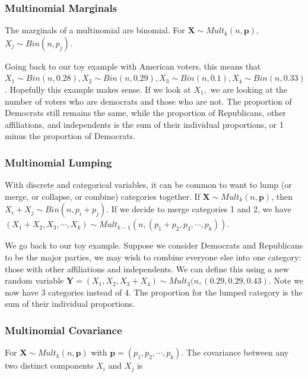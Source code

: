 \documentclass[
]{book}
\begin{document}
\subsubsection{Multinomial Marginals}\label{multinomial-marginals}

The marginals of a multinomial are binomial. For \(\boldsymbol{X} \sim Mult_k(n, \boldsymbol{p})\), \(X_j \sim Bin(n, p_j)\).

Going back to our toy example with American voters, this means that \(X_1 \sim Bin(n,0.28), X_2 \sim Bin(n,0.29), X_3 \sim Bin(n, 0.1), X_4 \sim Bin(n,0.33)\). Hopefully this example makes sense. If we look at \(X_1,\) we are looking at the number of voters who are democrats and those who are not. The proportion of Democrats still remains the same, while the proportion of Republicans, other affiliations, and independents is the sum of their individual proportions, or 1 minus the proportion of Democrats.

\subsubsection{Multinomial Lumping}\label{multinomial-lumping}

With discrete and categorical variables, it can be common to want to lump (or merge, or collapse, or combine) categories together. If \(\boldsymbol{X} \sim Mult_k(n, \boldsymbol{p})\), then \(X_i + X_j \sim Bin(n, p_i + p_j)\). If we decide to merge categories 1 and 2, we have \((X_1 + X_2, X_3, \cdots, X_k) \sim Mult_{k-1}(n, (p_1 + p_2, p_3, \cdots, p_k))\).

We go back to our toy example. Suppose we consider Democrats and Republicans to be the major parties, we may wish to combine everyone else into one category: those with other affiliations and independents. We can define this using a new random variable \(\boldsymbol{Y} = (X_1, X_2, X_3+X_4) \sim Mult_3(n,(0.29,0.29,0.43)\). Note we now have 3 categories instead of 4. The proportion for the lumped category is the sum of their individual proportions.

\subsubsection{Multinomial Covariance}\label{multinomial-covariance}

For \(\boldsymbol{X} \sim Mult_k(n, \boldsymbol{p})\) with \(\boldsymbol{p} = (p_1,p_2, \cdots, p_k)\). The covariance between any two distinct components \(X_i\) and \(X_j\) is
\end{document}
